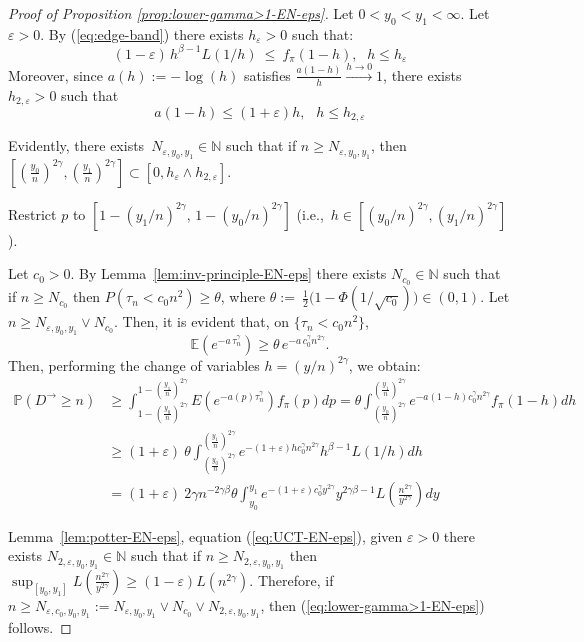 \documentclass[preprint]{imsart}
\newcommand{\PP}{\mathbb{P}}
\newcommand{\EE}{\mathbb{E}}
\newcommand{\1}{\mathbf{1}}
\theoremstyle{plain}
\theoremstyle{definition}
\begin{document}
\begin{proof}[Proof of Proposition \ref{prop:lower-gamma>1-EN-eps}]

Let \(0<y_0<y_1<\infty\). Let \(\varepsilon>0\). By (\ref{eq:edge-band}) there exists \(h_\varepsilon>0\) such that:
\[
(1-\varepsilon)\,h^{\beta-1}L(1/h)
\ \le\ f_\pi(1-h),\,\phantom{q}h\leq h_{\varepsilon}
\]
Moreover, since \(a(h):=-\log(h)\) satisfies \(\frac{a(1-h)}{h}\overset{h\to 0}{\to}1\), there exists \(h_{2,\varepsilon}>0\) such that 
\[
a(1-h)\le (1+\varepsilon)h,\,\phantom{a}h\le h_{2,\varepsilon}
\]

Evidently, there exists \(\,N_{\varepsilon,y_0,y_1}\in \mathbb{N}\) such that if \(n\geq N_{\varepsilon,y_0,y_1}\), then \([(\frac{y_0}{n})^{2\gamma},(\frac{y_1}{n})^{2\gamma}]\subset [0,h_{\varepsilon}\wedge h_{2,\varepsilon}]\).

Restrict \(p\) to \([1-(y_1/n)^{2\gamma},\,1-(y_0/n)^{2\gamma}]\) (i.e.,\ \(h\in[(y_0/n)^{2\gamma},(y_1/n)^{2\gamma}]\)). 

Let \(c_0>0\). By Lemma~\ref{lem:inv-principle-EN-eps} there exists \(N_{c_0}\in \mathbb{N}\) such that if \(n\ge N_{c_0}\) then \(P(\tau_n< c_0 n^2)\ge\theta\), where \(\theta:=\ \tfrac12\big(1-\Phi(1/\sqrt{c_0})\big)\in(0,1)\). Let \(n\ge N_{\varepsilon,y_0,y_1}\vee N_{c_0}\). Then, it is evident that, on \(\{\tau_n< c_0 n^2\}\),
\[
\EE(e^{-a\,\tau_n^\gamma})\ge \theta\,e^{-a\,c_0^\gamma n^{2\gamma}}.
\]
Then, performing the change of variables \(h=(y/n)^{2\gamma}\), we obtain:
\begin{equation}
    \begin{split}
        \PP(D^{\rightarrow}\ge n)&\geq \int_{1-(\frac{y_0}{n})^{2\gamma}}^{1-(\frac{y_1}{n})^{2\gamma}}E(e^{-a(p)\tau_n^{\gamma}})f_{\pi}(p)dp=\theta\int_{(\frac{y_0}{n})^{2\gamma}}^{(\frac{y_1}{n})^{2\gamma}}e^{-a(1-h)c_0^{\gamma}n^{2\gamma}}f_{\pi}(1-h)dh\\
        &\geq(1+\varepsilon)\ \theta\int_{(\frac{y_0}{n})^{2\gamma}}^{(\frac{y_1}{n})^{2\gamma}}e^{-(1+\varepsilon)hc_0^{\gamma}n^{2\gamma}}h^{\beta-1}L(1/h)dh\\
        &=(1+\varepsilon)\ 2\gamma n^{-2\gamma\beta}\theta\int_{y_0}^{y_1}e^{-(1+\varepsilon)c_0^{\gamma}y^{2\gamma}}y^{2\gamma\beta-1}L(\frac{n^{2\gamma}}{y^{2\gamma}})dy
    \end{split}
\end{equation}

Lemma~\ref{lem:potter-EN-eps}, equation (\ref{eq:UCT-EN-eps}), given \(\varepsilon>0\) there exists \(N_{2,\varepsilon,y_0,y_1}\in \mathbb{N}\) such that if \(n\geq N_{2,\varepsilon,y_0,y_1}\) then \(\sup_{[y_0,y_1]}L(\frac{n^{2\gamma}}{y^{2\gamma}})\geq (1-\varepsilon)L(n^{2\gamma})\). Therefore, if \(n\geq N_{\varepsilon,c_0,y_0,y_1}:=N_{\varepsilon,y_0,y_1}\vee N_{c_0}\vee N_{2,\varepsilon,y_0,y_1}\), then (\ref{eq:lower-gamma>1-EN-eps}) follows.



\end{proof}
\end{document}
